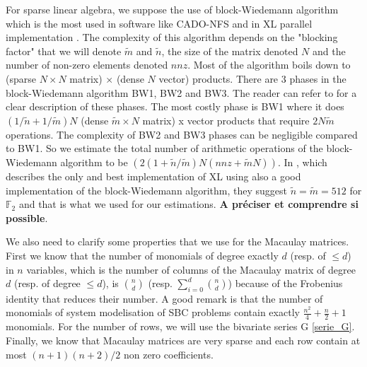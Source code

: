 \documentclass[english]{article}
\begin{document}
		For sparse linear algebra, we suppose the use of block-Wiedemann algorithm which is the most used in software like CADO-NFS \cite{cadonfs} and in XL parallel implementation \cite{NNY17}. The complexity of this algorithm depends on the "blocking factor" that we will denote $\tilde{m}$ and $\tilde{n}$, the size of the matrix denoted $N$ and the number of non-zero elements denoted $nnz$. Most of the algorithm boils down to (sparse $N \times N$ matrix) $\times$ (dense $N$ vector) products. There are 3 phases in the block-Wiedemann algorithm BW1, BW2 and BW3. The reader can refer to \cite{NNY17} for a clear description of these phases. The most costly phase is BW1 where it does $(1/\tilde{n} + 1/\tilde{m})N$ (dense $\tilde{m} \times N$ matrix) x vector products that require $2N\tilde{m}$ operations. The complexity of BW2 and BW3 phases can be negligible compared to BW1. So we estimate the total number of arithmetic operations of the block-Wiedemann algorithm to be $(2(1 + \tilde{n}/\tilde{m})N(nnz + \tilde{m}N))$. In \cite{NNY17}, which describes the only and best implementation of XL using also a good implementation of the block-Wiedemann algorithm, they suggest $\tilde{n} = \tilde{m} = 512$ for $\mathbb{F}_2$ and that is what we used for our estimations. \textbf{A préciser et comprendre si possible}.
		
		We also need to clarify some properties that we use for the Macaulay matrices. First we know that the number of monomials of degree exactly $d$ (resp. of $\leq d$) in $n$ variables, which is the number of columns of the Macaulay matrix of degree $d$ (resp. of degree $\leq d$), is $\binom{n}{d}$ (resp. $\sum_{i=0}^{d}\binom{n}{d}$) because of the Frobenius identity that reduces their number. A good remark is that the number of monomials of system modelisation of SBC problems contain exactly $\frac{n^2}{4} + \frac{n}{2} + 1$ monomials. For the number of rows, we will use the bivariate series G \ref{serie_G}. Finally, we know that Macaulay matrices are very sparse and each row contain at most $(n+1)(n+2)/2$ non zero coefficients.
		
\end{document}
